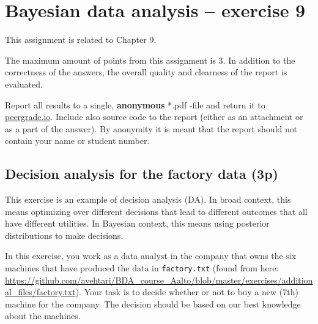 \documentclass[a4paper,11pt]{article}
\begin{document}
\thispagestyle{empty}

\section*{Bayesian data analysis -- exercise 9}
This assignment is related to Chapter 9.

The maximum amount of points from this assignment is 3. In addition to the correctness of the answers, the overall quality and clearness of the report is evaluated.

Report all results to a single, {\bf anonymous} *.pdf -file and return it to \href{peergrade.io}{peergrade.io}. Include also source code to the report (either as an attachment or as a part of the answer). By anonymity it is meant that the report should not contain your name or student number.

\vspace{1cm}

\subsection*{Decision analysis for the factory data (3p)}

This exercise is an example of decision analysis (DA). In broad context, this means optimizing over different decisions that lead to different outcomes that all have different utilities. In Bayesian context, this means using posterior distributions to make decisions.  

In this exercise, you work as a data analyst in the company that owns the six machines that have produced the data in \texttt{factory.txt} (found from here: \url{https://github.com/avehtari/BDA_course_Aalto/blob/master/exercises/additional_files/factory.txt}). Your task is to decide whether or not to buy a new (7th) machine for the company. The decision should be based on our best knowledge about the machines.
\end{document}
